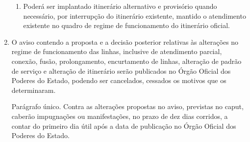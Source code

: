 \begin{enumerate}[resume, label=Art. \arabic*]
\begin{enumerate}[label= \S \arabic*]
\item Poderá ser implantado itinerário alternativo e provisório quando necessário, por interrupção do itinerário existente, mantido o atendimento existente no quadro de regime de funcionamento do itinerário oficial.

\end{enumerate}

\item O aviso contendo a proposta e a decisão posterior relativas às alterações no regime de funcionamento das linhas, inclusive de atendimento parcial, conexão, fusão, prolongamento, encurtamento de linhas, alteração de padrão de serviço e alteração de itinerário serão publicados no Órgão Oficial dos Poderes do Estado, podendo ser cancelados, cessados os motivos que os determinaram.

Parágrafo único. Contra as alterações propostas no aviso, previstas no caput, caberão impugnações ou manifestações, no prazo de dez dias corridos, a contar do primeiro dia útil após a data de publicação no Órgão Oficial dos Poderes do Estado.

\end{enumerate}
















